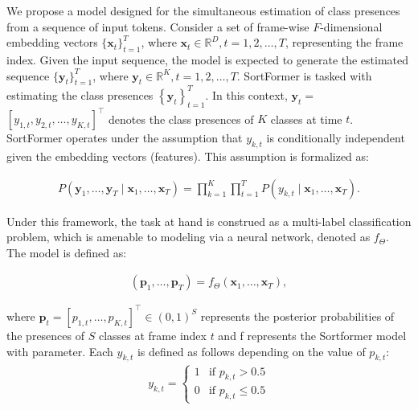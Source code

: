 \documentclass{article}
\begin{document}


We propose a model designed for the simultaneous estimation of class presences from a sequence of input tokens.
Consider a set of frame-wise \( F \)-dimensional embedding vectors
$ \{ \mathbf{x}_t \}_{t=1}^T $, where $ \mathbf{x}_t \in \mathbb{R}^D, t = 1, 2, \ldots, T $, representing the frame index.
Given the input sequence, the model is expected to generate the estimated sequence $\{ \mathbf{y}_t \}_{t=1}^T$, where $ \mathbf{y}_t \in \mathbb{R}^K, t = 1, 2, \ldots, T $.
SortFormer is tasked with estimating the class presences \( \left\{\mathbf{y}_t\right\}_{t=1}^T \). In this context, $\mathbf{y}_t =$ {\small $\left[y_{1, t}, y_{2, t}, \ldots, y_{K, t}\right]^{\top}$}
denotes the class presences of \( K \) classes at time \( t \). SortFormer operates under the assumption that $ y_{k, t} $ is conditionally independent given the embedding vectors (features). This assumption is formalized as:

\begin{align}
  P\left(\mathbf{y}_1, \ldots, \mathbf{y}_T \mid \mathbf{x}_1, \ldots, \mathbf{x}_T\right) = \prod_{k=1}^K\prod_{t=1}^T  P\left(y_{k, t} \mid \mathbf{x}_1, \ldots, \mathbf{x}_T\right).
\end{align}

Under this framework, the task at hand is construed as a multi-label classification problem, which is amenable to modeling via a neural network, denoted as  $f_{\Theta}$. The model is defined as:

\begin{align}
  \left(\mathbf{p}_1, \ldots, \mathbf{p}_T\right) = f_{\Theta}\left(\mathbf{x}_1, \ldots, \mathbf{x}_T\right),
\end{align}

where \( \mathbf{p}_t = \left[p_{1, t}, \ldots, p_{K, t}\right]^{\top} \in (0,1)^S \) represents the posterior probabilities of the presences of \( S \) classes at frame index \( t \) and f represents
the Sortformer model with parameter.
Each \( y_{k, t} \) is defined as follows depending on the value of \( p_{k, t} \):
\begin{align}
  y_{k,t} =
  \begin{cases}
    1 & \text{if } p_{k,t} > 0.5    \\
    0 & \text{if } p_{k,t} \leq 0.5
  \end{cases}
\end{align}
\end{document}
